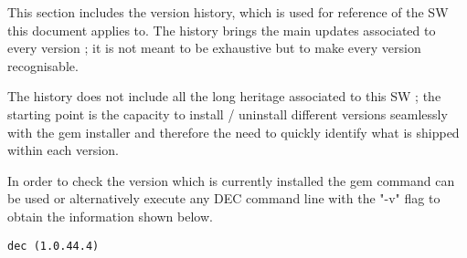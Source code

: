 \documentclass[dec_sum_main.tex]{subfiles}
\begin{document}
 
\par
\noindent
This section includes the version history, which is used for reference of the SW this document applies to. The history brings the main updates associated to every version ; it is not meant to be exhaustive but to make every version recognisable.\newline

\par
\noindent
The history does not include all the long heritage associated to this SW ; the starting point is the capacity to install / uninstall different versions seamlessly with the gem installer and therefore the need to quickly identify what is shipped within each version. \newline

\par
\noindent 
In order to check the version which is currently installed the gem command can be used or alternatively execute any DEC command line with the "-v" flag to obtain the information shown below. \newline


\begin{Verbatim}[tabsize=4]
    dec (1.0.44.4)
\end{Verbatim}

\end{document}

